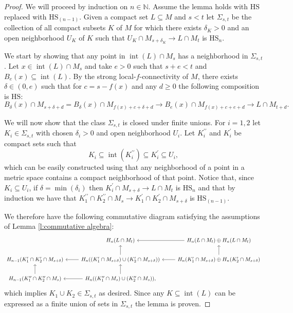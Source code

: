 \documentclass{amsart}
\theoremstyle{definition}
\newcommand{\N}{\mathbb{N}}
\newcommand{\HS}{\mathrm{HS}}
\newcommand{\dprime}{{\prime\prime}}
\DeclareMathOperator{\interior}{int}
\begin{document}
\begin{proof}
	We will proceed by induction on $n \in \N$. Assume the lemma holds with $\HS$ replaced with $\HS_{(n-1)}$.
	Given a compact set $L \subseteq M$ and $s < t$ let $\Sigma_{s, t}$ be the collection of all compact subsets $K$ of $M$ for which there exists $\delta_K > 0$ and an open neighborhood $U_K$ of $K$ such that $U_K \cap M_{s+\delta_K} \to L \cap M_{t}$ is $\HS_n$.
	
	We start by showing that any point in $\interior(L) \cap M_s$ has a neighborhood in $\Sigma_{s, t}$.
	Let $x \in \interior(L) \cap M_{s}$ and take $e > 0$ such that $s + e < t$ and $B_e(x) \subseteq \interior(L)$.
	By the strong local-$f$-connectivity of $M$, there exists $\delta \in (0, e)$ such that for $c = s - f(x)$ and any $d \geq 0$ the following composition is $\HS$:
	\begin{equation*}
	B_\delta(x) \cap M_{s + \delta + d} =
	B_\delta(x) \cap M_{f(x) + c + \delta + d} \to
	B_e(x) \cap M_{f(x) + c + e + d} \to
	L \cap M_{t + d}.
	\end{equation*}  
	
	We will now show that the class $\Sigma_{s,t}$ is closed under finite unions.
	For $i = 1, 2$ let $K_i \in \Sigma_{s,t}$ with chosen $\delta_i > 0$ and open neighborhood $U_i$. Let $K_i^\dprime$ and $K_i^\prime$ be compact sets such that
	\begin{equation*}
	K_i \subseteq \interior(K_i^\dprime) \subseteq K_i^\prime \subseteq U_i,
	\end{equation*}
	which can be easily constructed using that any neighborhood of a point in a metric space contains a compact neighborhood of that point.
	Notice that, since $K_i \subseteq U_i$, if $\delta = \min(\delta_i)$ then $K_i^\prime \cap M_{s+\delta} \to L \cap M_t$ is $\HS_n$ and that by induction we have that $K_1^\dprime \cap K_2^\dprime \cap M_s \to K_1^\prime \cap K_2^\prime \cap M_{s+\delta}$ is $\HS_{(n-1)}$.
	
	We therefore have the following commutative diagram satisfying the assumptions of Lemma \ref{l:commutative algebra}:
	\begin{equation*}
	\begin{tikzcd}
	& H_n(L \cap M_t) & \arrow[l] H_n(L \cap M_t) \oplus H_n(L \cap M_t) \\
	H_{n-1}(K_1^\prime \cap K_2^\prime \cap M_{s+\delta}) & 
	H_{n}((K_1^\prime \cap M_{s+\delta}) \cup (K_2^\prime \cap M_{s+\delta})) \arrow[l] \arrow[u] &
	H_{n}(K_1^\prime \cap M_{s+\delta}) \oplus H_n(K_2^\prime \cap M_{s+\delta}) \arrow[l] \arrow[u] \\
	H_{n-1}(K_1^\dprime \cap K_2^\dprime \cap M_s) \arrow[u] & 
	H_{n}((K_1^\dprime \cap M_s) \cup (K_2^\dprime \cap M_s)), \arrow[l] \arrow[u] &
	\end{tikzcd}
	\end{equation*}
	which implies $K_1 \cup K_2 \in \Sigma_{s, t}$ as desired. Since any $K \subseteq \interior(L)$ can be expressed as a finite union of sets in $\Sigma_{s,t}$ the lemma is proven.
\end{proof}
\end{document}
